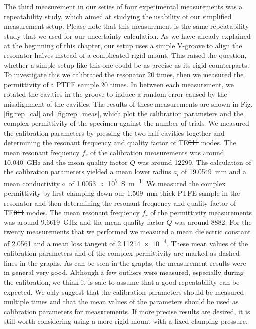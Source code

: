 The third measurement in our series of four experimental measurements was a repeatability study, which aimed at studying the usability of our simplified measurement setup. Please note that this measurement is the same repeatability study that we used for our uncertainty calculation. As we have already explained at the beginning of this chapter, our setup uses a simple V-groove to align the resonator halves instead of a complicated rigid mount. This raised the question, whether a simple setup like this one could be as precise as its rigid counterparts. To investigate this we calibrated the resonator 20 times, then we measured the permittivity of a PTFE sample 20 times. In between each measurement, we rotated the cavities in the groove to induce a random error caused by the misalignment of the cavities. The results of these measurements are shown in Fig. \ref{fig:rep_cal} and \ref{fig:rep_meas}, which plot the calibration parameters and the complex permittivity of the specimen against the number of trials. We measured the calibration parameters by pressing the two half-cavities together and determining the resonant frequency and quality factor of TE\st{011} modes. The mean resonant frequency $f_r$  of the calibration measurements was around \SI{10.040}{\giga\hertz} and the mean quality factor $Q$ was around \num{12299}. The calculation of the calibration parameters yielded a mean lower radius $a_l$ of \SI{19.0549}{\milli\meter} and a mean conductivity $\sigma$ of \SI{1.0053e7}{\siemens\per\meter}. We measured the complex permittivity by first clamping down our \SI{1.509}{\milli\meter} thick PTFE sample in the resonator and then determining the resonant frequency and quality factor of TE\st{011} modes. The mean resonant frequency $f_r$  of the permittivity measurements was around \SI{9.6619}{\giga\hertz} and the mean quality factor $Q$ was around \num{8882}. For the twenty measurements that we performed we measured a mean dielectric constant of \num{2.0561} and a mean loss tangent of \num{2.11214e-4}. These mean values of the calibration parameters and of the complex permittivity are marked as dashed lines in the graphs. As can be seen in the graphs, the measurement results were in general very good. Although a few outliers were measured, especially during the calibration, we think it is safe to assume that a good repeatability can be expected. We only suggest that the calibration parameters should be measured multiple times and that the mean values of the parameters should be used as calibration parameters for measurements. If more precise results are desired, it is still worth considering using a more rigid mount with a fixed clamping pressure.
